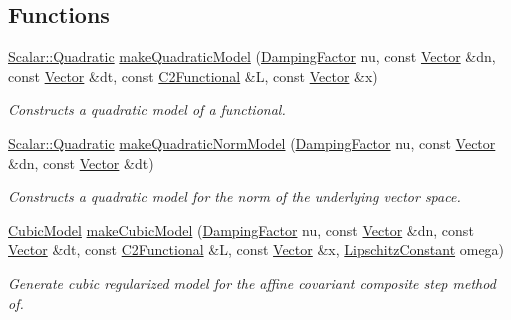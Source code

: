 \subsection*{\-Functions}
\begin{DoxyCompactItemize}
\item 
\hyperlink{classSpacy_1_1Scalar_1_1Quadratic}{\-Scalar\-::\-Quadratic} \hyperlink{namespaceSpacy_1_1CompositeStep_a56d3f30088fa92450ffc5f962a8bbfa8}{make\-Quadratic\-Model} (\hyperlink{classSpacy_1_1DampingFactor}{\-Damping\-Factor} nu, const \hyperlink{classSpacy_1_1Vector}{\-Vector} \&dn, const \hyperlink{classSpacy_1_1Vector}{\-Vector} \&dt, const \hyperlink{classSpacy_1_1C2Functional}{\-C2\-Functional} \&\-L, const \hyperlink{classSpacy_1_1Vector}{\-Vector} \&x)
\begin{DoxyCompactList}\small\item\em \-Constructs a quadratic model of a functional. \end{DoxyCompactList}\item 
\hyperlink{classSpacy_1_1Scalar_1_1Quadratic}{\-Scalar\-::\-Quadratic} \hyperlink{namespaceSpacy_1_1CompositeStep_a51f121673adedc63020b2ce90041c500}{make\-Quadratic\-Norm\-Model} (\hyperlink{classSpacy_1_1DampingFactor}{\-Damping\-Factor} nu, const \hyperlink{classSpacy_1_1Vector}{\-Vector} \&dn, const \hyperlink{classSpacy_1_1Vector}{\-Vector} \&dt)
\begin{DoxyCompactList}\small\item\em \-Constructs a quadratic model for the norm of the underlying vector space. \end{DoxyCompactList}\item 
\hyperlink{classSpacy_1_1CompositeStep_1_1CubicModel}{\-Cubic\-Model} \hyperlink{namespaceSpacy_1_1CompositeStep_a93960636b40b8cf95004a5dc27f961eb}{make\-Cubic\-Model} (\hyperlink{classSpacy_1_1DampingFactor}{\-Damping\-Factor} nu, const \hyperlink{classSpacy_1_1Vector}{\-Vector} \&dn, const \hyperlink{classSpacy_1_1Vector}{\-Vector} \&dt, const \hyperlink{classSpacy_1_1C2Functional}{\-C2\-Functional} \&\-L, const \hyperlink{classSpacy_1_1Vector}{\-Vector} \&x, \hyperlink{classSpacy_1_1LipschitzConstant}{\-Lipschitz\-Constant} omega)
\begin{DoxyCompactList}\small\item\em \-Generate cubic regularized model for the affine covariant composite step method of. \end{DoxyCompactList}\end{DoxyCompactItemize}


